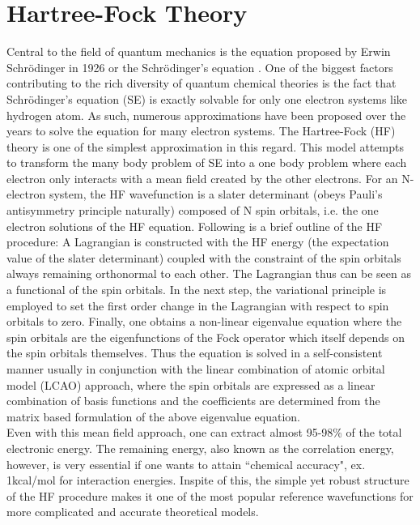 \section{Hartree-Fock Theory}
Central to the field of quantum mechanics is the equation proposed by Erwin Schr\"odinger 
in 1926 or the Schr\"odinger's equation \cite{Schrodinger26}. One of the biggest factors 
contributing to the rich diversity of quantum chemical theories is the fact that Schr\"odinger's equation (SE)
is exactly solvable for only one electron systems like hydrogen atom. As such, numerous approximations
have been proposed over the years to solve the equation for many electron systems.
The Hartree-Fock (HF) theory\cite{} is one of the simplest approximation in this regard. This
model attempts to transform the many body problem of SE into a one body problem where each electron
only interacts with a mean field created by the other electrons. For an N-electron system, the HF 
wavefunction is a slater determinant (obeys Pauli's antisymmetry principle naturally) composed of N 
spin orbitals, i.e. the one electron solutions of the HF equation. Following is a brief outline
of the HF procedure: A Lagrangian is constructed with the HF energy (the expectation value of the 
slater determinant) coupled with the constraint of the spin orbitals always remaining 
orthonormal to each other. The Lagrangian thus can be seen as a functional of the spin 
orbitals. In the next step, the variational principle is employed to set the first order 
change in the Lagrangian with respect to spin orbitals to zero. Finally, one obtains 
a non-linear eigenvalue equation where the spin orbitals are the eigenfunctions of 
the Fock operator which itself depends on the spin orbitals themselves. 
Thus the equation is solved in a self-consistent manner usually in conjunction with 
the linear combination of atomic orbital model (LCAO) approach, where the spin 
orbitals are expressed as a linear combination of basis functions and the 
coefficients are determined from the matrix based formulation of the above eigenvalue equation.\\
Even with this mean field approach, one can extract almost 95-98\% of the total 
electronic energy. The remaining energy, also known as the correlation energy,
however, is very essential if one wants to attain ``chemical accuracy", ex.  
1kcal/mol for interaction energies. Inspite of this, the simple yet robust 
structure of the HF procedure makes it one of the most popular reference 
wavefunctions for more complicated and accurate theoretical models.
